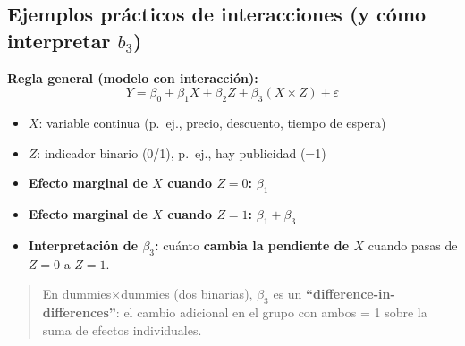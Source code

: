 \documentclass[
  spanish,
  letterpaper,
  DIV=11,
  numbers=noendperiod]{scrreprt}
\providecommand{\tightlist}{%
  \setlength{\itemsep}{0pt}\setlength{\parskip}{0pt}}
\begin{document}
\subsection{\texorpdfstring{Ejemplos prácticos de interacciones (y cómo
interpretar
\(b_3\))}{Ejemplos prácticos de interacciones (y cómo interpretar b\_3)}}\label{ejemplos-pruxe1cticos-de-interacciones-y-cuxf3mo-interpretar-b_3}

\textbf{Regla general (modelo con interacción):}\\
\[
Y = \beta_0 + \beta_1 X + \beta_2 Z + \beta_3(X \times Z) + \varepsilon
\]

\begin{itemize}
\tightlist
\item
  \(X\): variable continua (p.~ej., precio, descuento, tiempo de
  espera)\\
\item
  \(Z\): indicador binario (0/1), p.~ej., hay publicidad (=1)\\
\item
  \textbf{Efecto marginal de \(X\) cuando \(Z=0\): } \(β_1\)\\
\item
  \textbf{Efecto marginal de \(X\) cuando \(Z=1\): } \(β_1 + β_3\)\\
\item
  \textbf{Interpretación de \(β_3\): } cuánto \textbf{cambia la
  pendiente de \(X\)} cuando pasas de \(Z=0\) a \(Z=1\).
\end{itemize}

\begin{quote}
En dummies×dummies (dos binarias), \(β_3\) es un
\textbf{``difference-in-differences''}: el cambio adicional en el grupo
con ambos = 1 sobre la suma de efectos individuales.
\end{quote}
\end{document}
